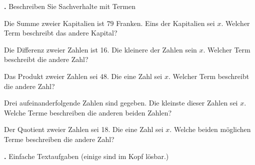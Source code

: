 \newpage

\textbf{\bbwAufgabenNummer{}.}
Beschreiben Sie Sachverhalte mit Termen


\begin{bbwAufgabenBlock}
\item Die Summe zweier Kapitalien ist $79$ Franken. Eins der
Kapitalien sei $x$. Welcher Term
beschreibt das andere Kapital?


\item Die Differenz zweier Zahlen ist 16. Die kleinere der Zahlen sein
$x$. Welcher Term beschreibt die andere Zahl?



\item Das Produkt zweier Zahlen sei 48. Die eine Zahl sei $x$. Welcher
Term beschreibt die andere Zahl?


\item Drei aufeinanderfolgende Zahlen sind gegeben. Die kleinste
dieser Zahlen sei $x$. Welche Terme beschreiben die anderen beiden
Zahlen?


\item Der Quotient zweier Zahlen sei 18. Die eine Zahl sei $x$. Welche
beiden möglichen Terme beschreiben die andere Zahl?


\end{bbwAufgabenBlock}

\newpage

\textbf{\bbwAufgabenNummer{}.}
Einfache Textaufgaben (einige sind im Kopf lösbar.)

